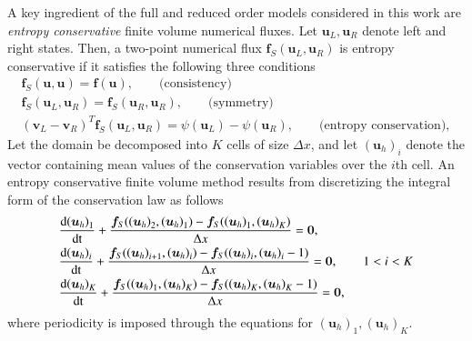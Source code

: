 \documentclass[preprint,10pt]{elsarticle}
\theoremstyle{definition}
\theoremstyle{lemma}
\theoremstyle{theorem}
\theoremstyle{assumption}
\newcommand{\td}[2]{\frac{{\rm d}#1}{{\rm d}{\rm #2}}}
\newcommand{\LRp}[1]{\left( #1 \right)}
\begin{document}
A key ingredient of the full and reduced order models considered in this work are \textit{entropy conservative} finite volume numerical fluxes.  Let $\bm{u}_L, \bm{u}_R$ denote left and right states.  Then, a two-point numerical flux $\bm{f}_S(\bm{u}_L, \bm{u}_R)$ is entropy conservative if it satisfies the following three conditions
\begin{gather}
\bm{f}_S(\bm{u},\bm{u}) = \bm{f}(\bm{u}), \qquad \text{(consistency)} \label{eq:esflux}\\
\bm{f}_S(\bm{u}_L,\bm{u}_R) = \bm{f}_S(\bm{u}_R,\bm{u}_R), \qquad \text{(symmetry)} \nonumber\\
\LRp{\bm{v}_L-\bm{v}_R}^T\bm{f}_S(\bm{u}_L,\bm{u}_R) = \psi(\bm{u}_L) - \psi(\bm{u}_R), \qquad \text{(entropy conservation)}\nonumber,
\end{gather}
Let the domain be decomposed into $K$ cells of size $\Delta x$, and let ${\LRp{\bm{u}_h}_i}$ denote the vector containing mean values of the conservation variables over the $i$th cell.  An entropy conservative finite volume method results from discretizing the integral form of the conservation law as follows
\begin{align}
&\td{{\LRp{\bm{u}_h}_1}}{t} + \frac{\bm{f}_S({\LRp{\bm{u}_h}_2},\LRp{\bm{u}_h}_1)-\bm{f}_S({\LRp{\bm{u}_h}_1},{\LRp{\bm{u}_h}_K})}{\Delta x} = \bm{0}, \label{eq:nonlineqs1d}\\
&\td{{\LRp{\bm{u}_h}_i}}{t} + \frac{\bm{f}_S({\LRp{\bm{u}_h}_{i+1}},\LRp{\bm{u}_h}_i)-\bm{f}_S({\LRp{\bm{u}_h}_i},{\LRp{\bm{u}_h}_i-1})}{\Delta x} = \bm{0}, \qquad 1 < i < K \nonumber\\
&\td{{\LRp{\bm{u}_h}_K}}{t} + \frac{\bm{f}_S({\LRp{\bm{u}_h}_1},\LRp{\bm{u}_h}_K)-\bm{f}_S({\LRp{\bm{u}_h}_K},{\LRp{\bm{u}_h}_K-1})}{\Delta x} = \bm{0},\nonumber
\end{align}
where periodicity is imposed through the equations for ${\LRp{\bm{u}_h}_1}, {\LRp{\bm{u}_h}_K}$.  
\end{document}
